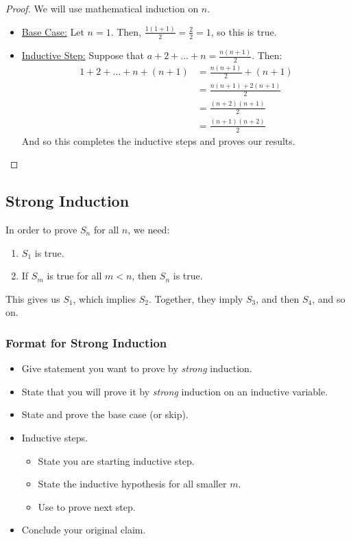 \documentclass[letterpaper]{article}
\begin{document}
\begin{proof}
    We will use mathematical induction on $n$. 
    \begin{itemize}
        \item[\mdiamond] \underline{Base Case:} Let $n = 1$. Then, $\frac{1(1 + 1)}{2} = \frac{2}{2} = 1$, so this is true.
        \item[\mdiamond] \underline{Inductive Step:} Suppose that $a + 2 + \dots + n = \frac{n(n + 1)}{2}$. Then:
        \begin{equation*}
            \begin{aligned}
                1 + 2 + \dots + n + (n + 1) &= \frac{n(n + 1)}{2} + (n + 1) \\ 
                    &= \frac{n(n + 1) + 2(n + 1)}{2} \\ 
                    &= \frac{(n + 2)(n + 1)}{2} \\ 
                    &= \frac{(n + 1)(n + 2)}{2}
            \end{aligned}
        \end{equation*}  
        And so this completes the inductive steps and proves our results. \qedhere
    \end{itemize}
\end{proof}

\subsection{Strong Induction}
In order to prove $S_n$ for all $n$, we need:
\begin{enumerate}
    \item $S_1$ is true.
    \item If $S_m$ is true for all $m < n$, then $S_n$ is true.
\end{enumerate}

This gives us $S_1$, which implies $S_2$. Together, they imply $S_3$, and then $S_4$, and so on.

\subsubsection{Format for Strong Induction}
\begin{itemize}
    \item Give statement you want to prove by \emph{strong} induction.
    \item State that you will prove it by \emph{strong} induction on an inductive variable.
    \item State and prove the base case (or skip).
    \item Inductive steps.
    \begin{itemize}
        \item State you are starting inductive step.
        \item State the inductive hypothesis for all smaller $m$.
        \item Use to prove next step.
    \end{itemize}
    \item Conclude your original claim.
\end{itemize}
\end{document}

